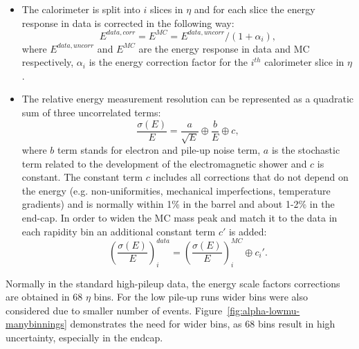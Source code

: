     \begin{itemize}
    	\item The calorimeter is split into $i$ slices in $\eta$ and for each slice the energy response in data is corrected in the following way:
    	\begin{equation*}
    		E^{data,corr}=E^{MC}=E^{data,uncorr}/(1+\alpha_i),
    	\end{equation*}
    	where $E^{data,uncorr}$ and $E^{MC}$ are the energy response in data and MC respectively, $\alpha_i$ is the energy correction factor for the $i^{th}$ calorimeter slice in $\eta$.
    	\item The relative energy measurement resolution can be represented as a quadratic sum of three uncorrelated terms:
    	\begin{equation*}
    	\frac{\sigma(E)}{E}=\frac{a}{\sqrt{E}} \oplus \frac{b}{E} \oplus c,
    	\end{equation*}
    	where $b$ term stands for electron and pile-up noise term, $a$ is the stochastic term related to the development of the electromagnetic shower and $c$ is constant. The constant term $c$ includes all corrections that do not depend on the energy (e.g. non-uniformities, mechanical imperfections, temperature gradients) and is normally within 1\% in the barrel and about 1-2\% in the end-cap. In order to widen the MC mass peak and match it to the data in each rapidity bin an additional constant term $c'$ is added: 
    	\begin{equation*}
    	\left(\frac{\sigma(E)}{E}\right)^{data}_i= \left(\frac{\sigma(E)}{E}\right)^{MC}_i \oplus c_i'.
    	\end{equation*}
    \end{itemize}

Normally in the standard high-pileup data, the energy scale factors corrections are obtained in 68 $\eta$ bins.
For the low pile-up runs wider bins were also considered due to smaller number of \Zee events. 
Figure~\ref{fig:alpha-lowmu-manybinnings} demonstrates the need for wider bins, as 68 bins result in high uncertainty, especially in the endcap.

